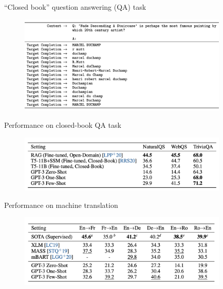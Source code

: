 
\begin{vbframe}{``Closed book'' question answering (QA) task}

\vfill
			
	\begin{figure}
		\centering
		\includegraphics[width=10cm]{figure/triviaformat.png}
	\end{figure}
	
\vfill

\end{vbframe}


\begin{vbframe}{Performance on closed-book QA task}

\vfill

	\begin{figure}
		\centering
		\includegraphics[width=10cm]{figure/triviaperf.png}
	\end{figure}

\vfill

\end{vbframe}


\begin{vbframe}{Performance on machine translation}

\vfill

	\begin{figure}
		\centering
		\includegraphics[width=10cm]{figure/mtperf.png}
	\end{figure}

\vfill

\end{vbframe}

